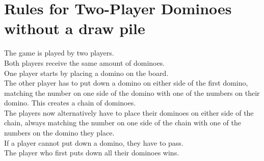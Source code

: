 \documentclass[12pt,a4paper]{article}
\begin{document}
\section{Rules for Two-Player Dominoes without a draw pile}
\label{a:domrules}
The game is played by two players. \\
Both players receive the same amount of dominoes. \\
One player starts by placing a domino on the board. \\
The other player has to put down a domino on either side of the first domino, matching the number on one side of the domino with one of the numbers on their domino. This creates a chain of dominoes. \\
The players now alternatively have to place their dominoes on either side of the chain, always matching the number on one side of the chain with one of the numbers on the domino they place. \\
If a player cannot put down a domino, they have to pass. \\
The player who first puts down all their dominoes wins.
\end{document}
